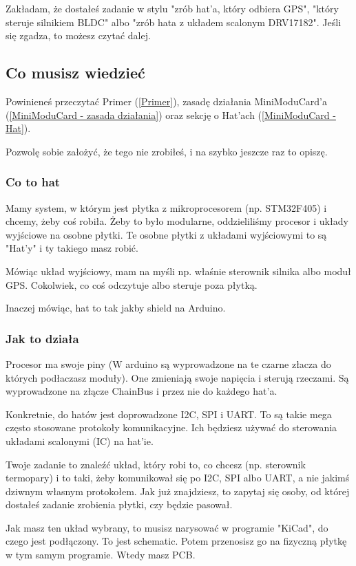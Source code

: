 \documentclass[b5paper, 10pt, twoside]{book}
\begin{document}
Zakładam, że dostałeś zadanie w stylu "zrób hat'a, który odbiera GPS", "który steruje silnikiem BLDC" albo "zrób hata z układem scalonym DRV17182". Jeśli się zgadza, to możesz czytać dalej.

\subsection{Co musisz wiedzieć}
Powinieneś przeczytać Primer (\ref{Primer}), zasadę działania MiniModuCard'a (\ref{MiniModuCard - zasada działania}) oraz sekcję o Hat'ach (\ref{MiniModuCard - Hat}).

Pozwolę sobie założyć, że tego nie zrobiłeś, i na szybko jeszcze raz to opiszę.

\subsubsection{Co to hat}

Mamy system, w którym jest płytka z mikroprocesorem (np. STM32F405) i chcemy, żeby coś robiła. Żeby to było modularne, oddzieliliśmy procesor i układy wyjściowe na osobne płytki. Te osobne płytki z układami wyjściowymi to są "Hat'y" i ty takiego masz robić.

Mówiąc układ wyjściowy, mam na myśli np. właśnie sterownik silnika albo moduł GPS. Cokolwiek, co coś odczytuje albo steruje poza płytką.

Inaczej mówiąc, hat to tak jakby shield na Arduino.

\subsubsection{Jak to działa}

Procesor ma swoje piny (W arduino są wyprowadzone na te czarne złacza do których podłaczasz moduły). One zmieniają swoje napięcia i sterują rzeczami. Są wyprowadzone na złącze ChainBus i przez nie do każdego hat'a.

Konkretnie, do hatów jest doprowadzone I2C, SPI i UART. To są takie mega często stosowane protokoły komunikacyjne. Ich będziesz używać do sterowania układami scalonymi (IC) na hat'ie.

Twoje zadanie to znaleźć układ, który robi to, co chcesz (np. sterownik termopary) i to taki, żeby komunikował się po I2C, SPI albo UART, a nie jakimś dziwnym własnym protokołem. Jak już znajdziesz, to zapytaj się osoby, od której dostałeś zadanie zrobienia płytki, czy będzie pasował.

Jak masz ten układ wybrany, to musisz narysować w programie "KiCad", do czego jest podłączony. To jest schematic. Potem przenosisz go na fizyczną płytkę w tym samym programie. Wtedy masz PCB.
\end{document}
